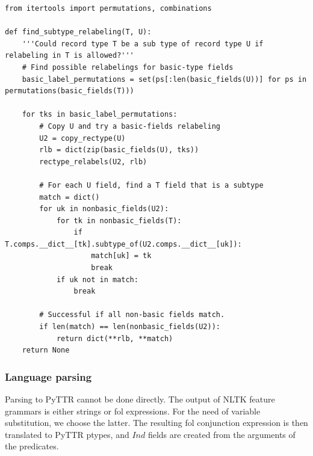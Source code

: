 \begin{lstlisting}[label=lst:subtyperlb, caption=Subtype-relabeling.]
from itertools import permutations, combinations

def find_subtype_relabeling(T, U):
    '''Could record type T be a sub type of record type U if relabeling in T is allowed?'''
    # Find possible relabelings for basic-type fields
    basic_label_permutations = set(ps[:len(basic_fields(U))] for ps in permutations(basic_fields(T)))
    
    for tks in basic_label_permutations:
        # Copy U and try a basic-fields relabeling
        U2 = copy_rectype(U)
        rlb = dict(zip(basic_fields(U), tks))
        rectype_relabels(U2, rlb)
        
        # For each U field, find a T field that is a subtype
        match = dict()
        for uk in nonbasic_fields(U2):
            for tk in nonbasic_fields(T):
                if T.comps.__dict__[tk].subtype_of(U2.comps.__dict__[uk]):
                    match[uk] = tk
                    break
            if uk not in match:
                break

        # Successful if all non-basic fields match.
        if len(match) == len(nonbasic_fields(U2)):
            return dict(**rlb, **match)
    return None
\end{lstlisting}



\subsubsection{Language parsing}

Parsing to PyTTR cannot be done directly.
The output of NLTK feature grammars is either strings or \gls{fol} expressions.
For the need of variable substitution, we choose the latter.
The resulting \gls{fol} conjunction expression is then translated to PyTTR ptypes, and $Ind$ fields are created from the arguments of the predicates.

